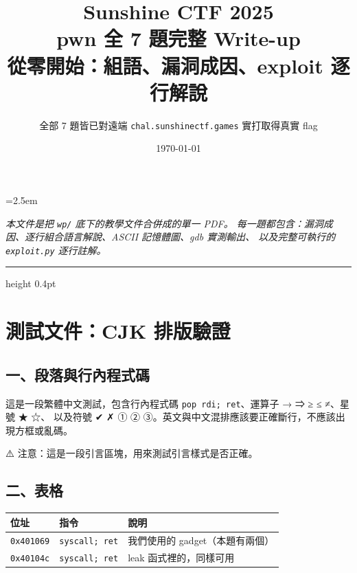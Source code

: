 \documentclass[10pt,a4paper]{article}
\title{\vspace{-1.2cm}\Huge\bfseries\color{dshblue} Sunshine CTF 2025\\[0.25em] pwn 全 7 題完整 Write-up\\[0.35em]
       \large\normalfont\color{dshgray} 從零開始：組語、漏洞成因、exploit 逐行解說}
\author{\normalsize 全部 7 題皆已對遠端 \texttt{chal.sunshinectf.games} 實打取得真實 flag}
\date{\normalsize\today}
\renewenvironment{quote}{%
  \begin{mdframed}[linewidth=0pt,innerleftmargin=0pt,innerrightmargin=0pt,
    innerbottommargin=0pt,innertopmargin=0pt,skipabove=0.55em,skipbelow=0.55em,
    leftmargin=0.9em,rightmargin=0.4em,startcode={\color{quotebar}\vrule width 2.6pt},%
    endcode={}]%
  \itshape\color{black}%
}{%
  \end{mdframed}%
}
\begin{document}
\sloppy
\emergencystretch=2.5em

{\hypersetup{linkcolor=dshblue}
\maketitle
\thispagestyle{plain}

\begin{center}
\begin{minipage}{0.9\textwidth}
\small\itshape\color{dshgray}
本文件是把 \texttt{wp/} 底下的教學文件合併成的單一 PDF。
每一題都包含：漏洞成因、逐行組合語言解說、ASCII 記憶體圖、gdb 實測輸出、
以及完整可執行的 \texttt{exploit.py} 逐行註解。
\end{minipage}
\end{center}

\vspace{0.6em}
\hrule height 0.4pt
\vspace{0.4em}

\renewcommand{\contentsname}{目錄}
\setcounter{tocdepth}{1}
\tableofcontents

\clearpage
}

\section{測試文件：CJK
排版驗證}\label{ux6e2cux8a66ux6587ux4ef6cjk-ux6392ux7248ux9a57ux8b49}

\subsection{一、段落與行內程式碼}\label{ux4e00ux6bb5ux843dux8207ux884cux5167ux7a0bux5f0fux78bc}

這是一段繁體中文測試，包含行內程式碼 \texttt{pop\ rdi;\ ret}、運算子 → ⇒
≥ ≤ ≠、星號 ★ ☆、 以及符號 ✔ ✗ ① ②
③。英文與中文混排應該要正確斷行，不應該出現方框或亂碼。

\begin{quote}
⚠️ 注意：這是一段引言區塊，用來測試引言樣式是否正確。
\end{quote}

\subsection{二、表格}\label{ux4e8cux8868ux683c}

{\def\LTcaptype{none} %
\begin{longtable}[]{@{}lll@{}}
\toprule\noalign{}
位址 & 指令 & 說明 \\
\midrule\noalign{}
\endhead
\bottomrule\noalign{}
\endlastfoot
\texttt{0x401069} & \texttt{syscall;\ ret} & 我們使用的
gadget（本題有兩個） \\
\texttt{0x40104c} & \texttt{syscall;\ ret} & leak 函式裡的，同樣可用 \\
\end{longtable}
}
\end{document}
